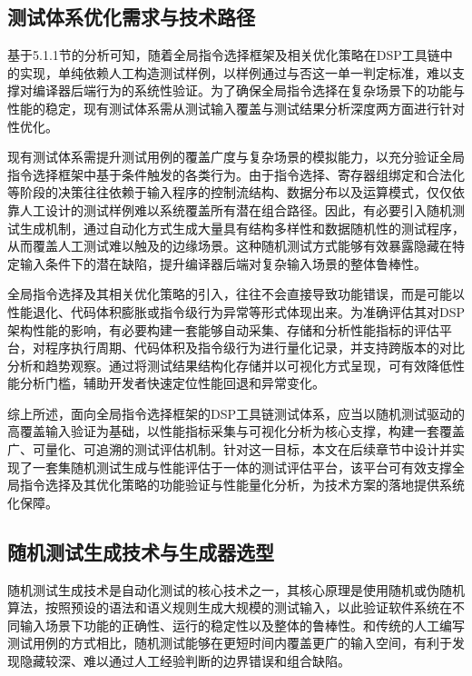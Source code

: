 \subsection{测试体系优化需求与技术路径}
基于5.1.1节的分析可知，随着全局指令选择框架及相关优化策略在DSP工具链中的实现，单纯依赖人工构造测试样例，以样例通过与否这一单一判定标准，难以支撑对编译器后端行为的系统性验证。为了确保全局指令选择在复杂场景下的功能与性能的稳定，现有测试体系需从测试输入覆盖与测试结果分析深度两方面进行针对性优化。

\par

现有测试体系需提升测试用例的覆盖广度与复杂场景的模拟能力，以充分验证全局指令选择框架中基于条件触发的各类行为。由于指令选择、寄存器组绑定和合法化等阶段的决策往往依赖于输入程序的控制流结构、数据分布以及运算模式，仅仅依靠人工设计的测试样例难以系统覆盖所有潜在组合路径。因此，有必要引入随机测试生成机制，通过自动化方式生成大量具有结构多样性和数据随机性的测试程序，从而覆盖人工测试难以触及的边缘场景。这种随机测试方式能够有效暴露隐藏在特定输入条件下的潜在缺陷，提升编译器后端对复杂输入场景的整体鲁棒性。

\par

全局指令选择及其相关优化策略的引入，往往不会直接导致功能错误，而是可能以性能退化、代码体积膨胀或指令级行为异常等形式体现出来。为准确评估其对DSP架构性能的影响，有必要构建一套能够自动采集、存储和分析性能指标的评估平台，对程序执行周期、代码体积及指令级行为进行量化记录，并支持跨版本的对比分析和趋势观察。通过将测试结果结构化存储并以可视化方式呈现，可有效降低性能分析门槛，辅助开发者快速定位性能回退和异常变化。

\par

综上所述，面向全局指令选择框架的DSP工具链测试体系，应当以随机测试驱动的高覆盖输入验证为基础，以性能指标采集与可视化分析为核心支撑，构建一套覆盖广、可量化、可追溯的测试评估机制。针对这一目标，本文在后续章节中设计并实现了一套集随机测试生成与性能评估于一体的测试评估平台，该平台可有效支撑全局指令选择及其优化策略的功能验证与性能量化分析，为技术方案的落地提供系统化保障。


\subsection{随机测试生成技术与生成器选型}
随机测试生成技术是自动化测试的核心技术之一，其核心原理是使用随机或伪随机算法，按照预设的语法和语义规则生成大规模的测试输入，以此验证软件系统在不同输入场景下功能的正确性、运行的稳定性以及整体的鲁棒性。和传统的人工编写测试用例的方式相比，随机测试能够在更短时间内覆盖更广的输入空间，有利于发现隐藏较深、难以通过人工经验判断的边界错误和组合缺陷。


